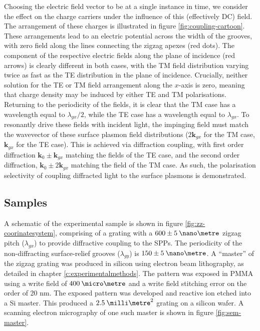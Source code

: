 Choosing the electric field vector to be at a single instance in time, we consider the effect on the charge carriers under the influence of this (effectively DC) field. The arrangement of these charges is illustrated in figure \ref{fig:coupling-cartoon}. These arrangements lead to an electric potential across the width of the grooves, with zero field along the lines connecting the zigzag apexes (red dots). The component of the respective electric fields along the plane of incidence (red arrows) is clearly different in both cases, with the TM field distribution varying twice as fast as the TE distribution in the plane of incidence. Crucially, neither solution for the TE or TM field arrangement along the $x$-axis is zero, meaning that charge density may be induced by either TE and TM polarisations. Returning to the periodicity of the fields, it is clear that the TM case has a wavelength equal to $\lambda_{gx}/2$, while the TE case has a wavelength equal to $\lambda_{gx}$. To resonantly drive these fields with incident light, the impinging field must match the wavevector of these surface plasmon field distributions ($2\mathbf{k}_{gx}$ for the TM case, $\mathbf{k}_{gx}$ for the TE case). This is achieved via diffraction coupling, with first order diffraction $\mathbf{k}_0\pm \mathbf{k}_{gx}$ matching the fields of the TE case, and the second order diffraction, $\mathbf{k}_0 \pm 2\mathbf{k}_{gx}$ matching the field of the TM case. As such, the polarisation selectivity of coupling diffracted light to the surface plasmons is demonstrated.

\subsection{Samples}
A schematic of the experimental sample is shown in figure \ref{fig:zz-coorinatesystem}, comprising of a grating with a $600 \pm 5 \:\nano\metre$ zigzag pitch ($\lambda_{gx}$) to provide diffractive coupling to the SPPs. The periodicity of the non-diffracting surface-relief grooves ($\lambda_{gy}$) is $150 \pm 5 \:\nano\metre$.
A “master” of the zigzag grating was produced in silicon using electron beam lithography, as detailed in chapter \ref{c:experimentalmethods}. The pattern was exposed in PMMA using a write field of $400 \:\micro\metre$ and a write field stitching error on the order of 20 nm. The exposed pattern was developed and reactive ion etched into a Si master. This produced a $2.5 \:\milli\metre^2$ grating on a silicon wafer. A scanning electron micrography of one such master is shown in figure \ref{fig:sem-master}.

